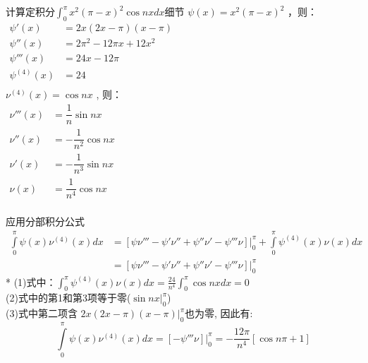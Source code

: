 \begin{frame}
	\begin{alertblock}{计算定积分$\int_{0}^{\pi}   x^2 (\pi-x)^2   \cos nx dx $细节}
		$\psi (x) = x^2 (\pi-x)^2$ ，则：\\
		$\displaystyle \begin{array}{lllllllll}
			\psi ' (x) &=  2x(2x - \pi )(x - \pi ) \\
			\psi '' (x) &=  2\pi ^2 -12\pi x+12x^2 \\
			\psi ''' (x) &=  24x -12 \pi \\
			\psi^{(4)} (x) &=  24  \\
		\end{array}$ \\ 
		$\nu^{(4)} (x) = \cos nx$ , 则：\\
		$\displaystyle \begin{array}{lllllllll}
			\nu ''' (x) &= \dfrac{1}{n} \sin nx \\
			\nu '' (x) &= -\dfrac{1}{n^2} \cos nx \\
			\nu ' (x) &= -\dfrac{1}{n^3} \sin nx \\
			\nu (x) &= \dfrac{1}{n^4} \cos nx \\
		\end{array}$ \\ 
	\end{alertblock}
\end{frame}	

\begin{frame}
	应用分部积分公式 \\
	$\displaystyle \begin{array}{lllllllll}
		\int\limits_{0}^{\pi}  \psi (x) \nu^{(4)} (x)  dx 
		&= [ \psi \nu''' - \psi' \nu'' + \psi'' \nu' -\psi''' \nu ]|_0 ^\pi +	\int\limits_{0}^{\pi}  \psi^{(4)} (x)  \nu (x)  dx  \\
		&=  [ \psi \nu''' - \psi' \nu'' + \psi'' \nu' -\psi''' \nu ]|_0 ^\pi 
	\end{array}$ \\ 
    * (1)式中：$\int_{0}^{\pi}  \psi^{(4)} (x)  \nu (x)  dx = \frac{24}{n^4} \int_{0}^{\pi}  \cos nx dx =0$ \\
	(2)式中的第1和第3项等于零($\sin nx |_0 ^\pi$) \\
    (3)式中第二项含 $2x(2x - \pi )(x - \pi )|_0 ^\pi$也为零, 因此有:
	\begin{equation*}
		\int\limits_{0}^{\pi}  \psi (x) \nu^{(4)} (x)  dx = [-\psi''' \nu ]|_0 ^\pi =  -\dfrac{12 \pi}{n^4}  [\cos n\pi +1 ]
	\end{equation*}
\end{frame}	


